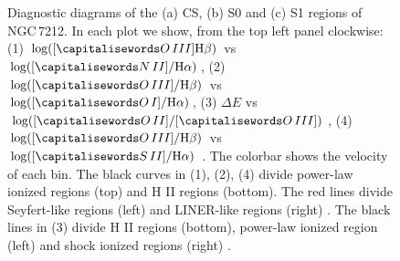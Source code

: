 \documentclass[../thesis.tex]{subfiles}
\begin{document}
\begin{figure}
\centering
{} \quad
{}\\
\\
\caption[]{Diagnostic diagrams of the (a) CS, (b) S0 and (c) S1 regions of NGC\,7212. In each plot we show, from the top left panel clockwise: (1) $\log([\ion{O}{III}] \Hb)$ vs $\log([\ion{N}{II}]/ \Ha)$, (2) $\log([\ion{O}{III}]/ \Hb)$ vs $\log([\ion{O}{I}]/ \Ha)$, (3) $\Delta E$ vs $\log([\ion{O}{II}]/[\ion{O}{III}])$, (4) $\log([\ion{O}{III}]/ \Hb)$ vs $\log([\ion{S}{II}]/ \Ha)$ \citep{Baldwin81, Veilleux87}. The colorbar shows the velocity of each bin. The black curves in (1), (2), (4) divide power-law ionized regions (top) and H II regions (bottom). The red lines divide Seyfert-like regions (left) and LINER-like regions (right) \citep{Kewley06}. The black lines in (3) divide H II regions (bottom), power-law ionized region (left) and shock ionized regions (right) \citep{Baldwin81}. }
\label{fig:diag_s1N}
\end{figure}
\end{document}
